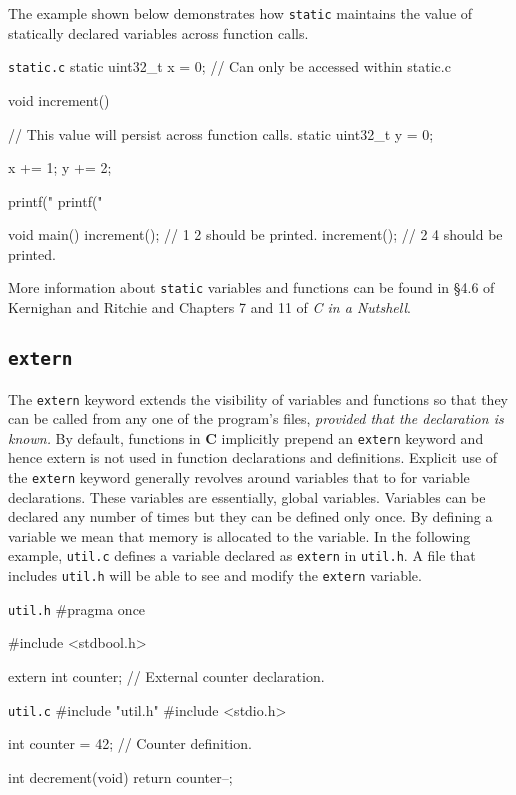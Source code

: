 \documentclass[11pt]{article}
\begin{document}
The example shown below demonstrates how \texttt{static} maintains the value of
statically declared variables across function calls.

\begin{clisting}{\texttt{static.c}}
static uint32_t x = 0; // Can only be accessed within static.c

void increment() {
    // This value will persist across function calls.
    static uint32_t y = 0;

    x += 1;
    y += 2;

    printf("%
    printf("%
}

void main() {
    increment(); // 1 2 should be printed.
    increment(); // 2 4 should be printed.
}
\end{clisting}

More information about \texttt{static} variables and functions can be found in
\S 4.6 of Kernighan and Ritchie and Chapters 7 and 11 of \emph{C in a Nutshell}.


\subsection{\texttt{extern}}

The \texttt{extern} keyword extends the visibility of variables and functions so
that they can be called from any one of the program's files, \emph{provided that
the declaration is known.} By default, functions in \textbf{C} implicitly
prepend an \texttt{extern} keyword and hence extern is not used in function declarations and definitions.
Explicit use of the \texttt{extern} keyword generally revolves around variables that to for variable declarations.
These variables are essentially, global variables. Variables can be declared any number of times but they can
be defined only once.  By defining a variable we mean that memory is allocated to the variable. In the following
example, \texttt{util.c} defines a variable declared as \texttt{extern} in \texttt{util.h}. A file that includes \texttt{util.h}
will be able to see and modify the \texttt{extern} variable.

\begin{clisting}{\texttt{util.h}}
#pragma once

#include <stdbool.h>

extern int counter; // External counter declaration.
\end{clisting}

\begin{clisting}{\texttt{util.c}}
#include "util.h"
#include <stdio.h>

int counter = 42; // Counter definition.

int decrement(void) {
    return counter--;
}
\end{clisting}
\end{document}
